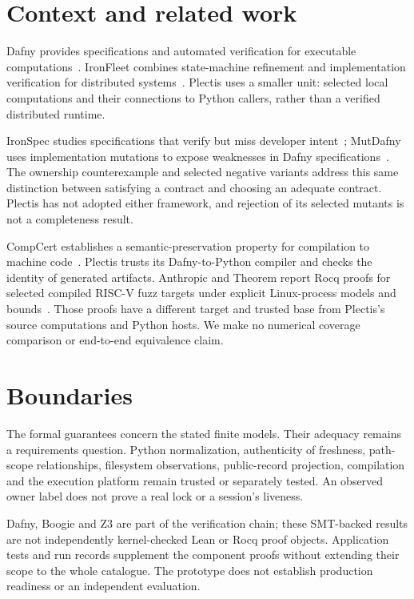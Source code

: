 \documentclass[11pt]{article}
\begin{document}
\section{Context and related work}
\label{sec:related}
Dafny provides specifications and automated verification for executable
computations~\cite{dafny}. IronFleet combines state-machine refinement and
implementation verification for distributed systems~\cite{ironfleet}. Plectis
uses a smaller unit: selected local computations and their connections to
Python callers, rather than a verified distributed runtime.

IronSpec studies specifications that verify but miss developer
intent~\cite{ironspec}; MutDafny uses implementation mutations to expose weaknesses
in Dafny specifications~\cite{mutdafny}. The ownership counterexample and selected
negative variants address this same distinction between satisfying a contract
and choosing an adequate contract. Plectis has not adopted either framework,
and rejection of its selected mutants is not a completeness result.

CompCert establishes a semantic-preservation property for compilation to machine
code~\cite{compcert}. Plectis trusts its Dafny-to-Python compiler and checks the
identity of generated artifacts. Anthropic and Theorem report Rocq proofs for
selected compiled RISC-V fuzz targets under explicit Linux-process models and
bounds~\cite{anthropic,theorem}. Those proofs have a different target and trusted
base from Plectis's source computations and Python hosts. We make no numerical
coverage comparison or end-to-end equivalence claim.

\section{Boundaries}
\label{sec:scope}
The formal guarantees concern the stated finite models. Their adequacy remains
a requirements question. Python normalization, authenticity of freshness,
path-scope relationships, filesystem observations, public-record projection,
compilation and the execution platform remain trusted or separately tested.
An observed owner label does not prove a real lock or a session's liveness.

Dafny, Boogie and Z3 are part of the verification chain; these SMT-backed results
are not independently kernel-checked Lean or Rocq proof objects. Application
tests and run records supplement the component proofs without extending their
scope to the whole catalogue. The prototype does not establish production
readiness or an independent evaluation.
\end{document}
